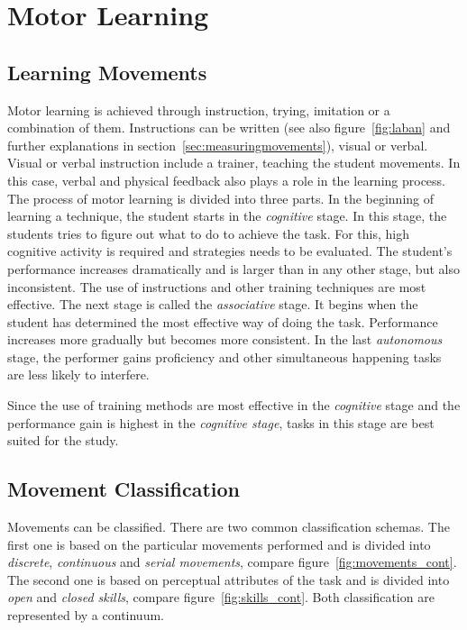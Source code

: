 \section{Motor Learning}
\subsection{Learning Movements}
Motor learning is achieved through instruction, trying, imitation or a combination of them. Instructions can be written (see also figure~\ref{fig:laban} and further explanations in section~\ref{sec:measuringmovements}), visual or verbal. Visual or verbal instruction include a trainer, teaching the student movements. In this case, verbal and physical feedback also plays a role in the learning process. The process of motor learning is divided into three parts. In the beginning of learning a technique, the student starts in the \textit{cognitive} stage. In this stage, the students tries to figure out what to do to achieve the task. For this, high cognitive activity is required and strategies needs to be evaluated. The student's performance increases dramatically and is larger than in any other stage, but also inconsistent. The use of instructions and other training techniques are most effective. The next stage is called the \textit{associative} stage. It begins when the student has determined the most effective way of doing the task. Performance increases more gradually but becomes more consistent. In the last \textit{autonomous} stage, the performer gains proficiency and other simultaneous happening tasks are less likely to interfere. 
\begin{tcolorbox}[colback=red!30!white]
Since the use of training methods are most effective in the \textit{cognitive} stage and the performance gain is highest in the \textit{cognitive stage}, tasks in this stage are best suited for the study.
\end{tcolorbox}


\subsection{Movement Classification}
Movements can be classified. There are two common classification schemas. The first one is based on the particular movements performed and is divided into \textit{discrete}, \textit{continuous} and \textit{serial movements}, compare figure~\ref{fig:movements_cont}. The second one is based on perceptual attributes of the task and is divided into \textit{open} and \textit{closed skills}, compare figure~\ref{fig:skills_cont}. Both classification are represented by a continuum.


